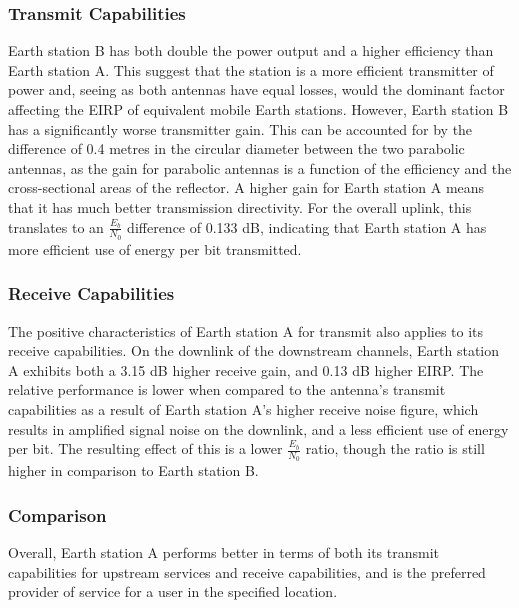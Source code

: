 \documentclass[12pt]{article}
\begin{document}
\subsubsection{Transmit Capabilities}

Earth station B has both double the power output and a higher efficiency than Earth station A. This suggest that the station is a more efficient transmitter of power and, seeing as both antennas have equal losses, would the dominant factor affecting the EIRP of equivalent mobile Earth stations. However, Earth station  B has a significantly worse transmitter gain. This can be accounted for by the difference of 0.4 metres in the circular diameter between the two parabolic antennas, as the gain for parabolic antennas is a function of the efficiency and the cross-sectional areas of the reflector. A higher gain for Earth station A means that it has much better transmission directivity. For the overall uplink, this translates to an \(\frac{E_b}{N_0}\) difference of 0.133 dB, indicating that Earth station A has more efficient use of energy per bit transmitted. 

\subsubsection{Receive Capabilities}
The positive characteristics of Earth station A for transmit also applies to its receive capabilities. On the downlink of the downstream channels, Earth station A exhibits both a 3.15 dB higher receive gain, and 0.13 dB higher EIRP. The relative performance is lower when compared to the antenna's transmit capabilities as a result of Earth station A's higher receive noise figure, which results in amplified signal noise on the downlink, and a less efficient use of energy per bit. The resulting effect of this is a lower \(\frac{E_b}{N_0}\) ratio, though the ratio is still higher in comparison to Earth station B. 

\subsubsection{Comparison}

Overall, Earth station A performs better in terms of both its transmit capabilities for upstream services and receive capabilities, and is the preferred provider of service for a user in the specified location.

\newpage
\end{document}
